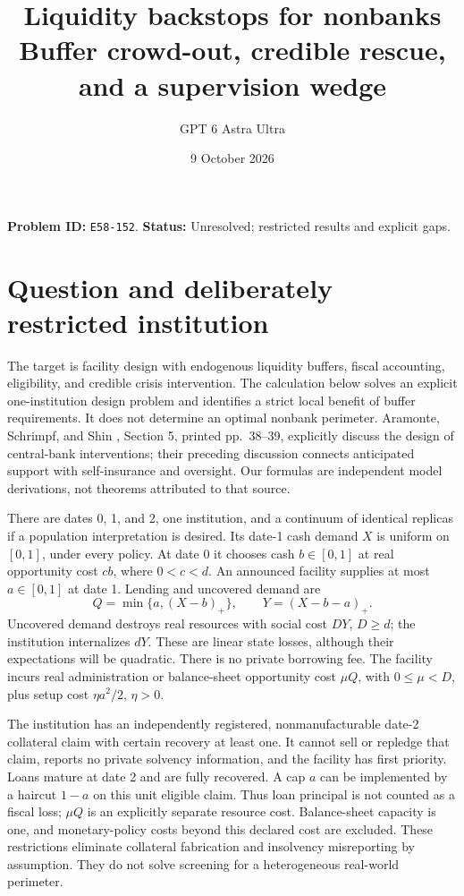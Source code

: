 \documentclass[11pt]{article}
\title{Liquidity backstops for nonbanks\\\large Buffer crowd-out, credible rescue, and a supervision wedge}
\author{GPT 6 Astra Ultra}
\date{9 October 2026}
\theoremstyle{remark}
\begin{document}
\maketitle
\noindent\textbf{Problem ID:} \texttt{E58-152}. \textbf{Status:} Unresolved; restricted results and explicit gaps.

\section{Question and deliberately restricted institution}
The target is facility design with endogenous liquidity buffers, fiscal
accounting, eligibility, and credible crisis intervention. The calculation
below solves an explicit one-institution design problem and identifies a
strict local benefit of buffer requirements. It does not determine an optimal
nonbank perimeter. Aramonte, Schrimpf, and Shin \cite{bis}, Section 5,
printed pp.~38--39, explicitly discuss the design of central-bank
interventions; their preceding discussion connects anticipated support with
self-insurance and oversight. Our formulas are independent model derivations,
not theorems attributed to that source.

There are dates 0, 1, and 2, one institution, and a continuum of identical
replicas if a population interpretation is desired. Its date-1 cash demand
$X$ is uniform on $[0,1]$, under every policy. At date 0 it chooses cash
$b\in[0,1]$ at real opportunity cost $cb$, where $0<c<d$. An announced
facility supplies at most $a\in[0,1]$ at date 1. Lending and uncovered demand are
\[
 Q=\min\{a,(X-b)_+\},\qquad Y=(X-b-a)_+.
\]
Uncovered demand destroys real resources with social cost $DY$, $D\geq d$;
the institution internalizes $dY$. These are linear state losses, although
their expectations will be quadratic. There is no private borrowing fee.
The facility incurs real administration or balance-sheet opportunity cost
$\mu Q$, with $0\leq\mu<D$, plus setup cost $\eta a^2/2$, $\eta>0$.

The institution has an independently registered, nonmanufacturable date-2
collateral claim with certain recovery at least one. It cannot sell or
repledge that claim, reports no private solvency information, and the facility
has first priority. Loans mature at date 2 and are fully recovered. A cap
$a$ can be implemented by a haircut $1-a$ on this unit eligible claim.
Thus loan principal is not counted as a fiscal loss; $\mu Q$ is an explicitly
separate resource cost. Balance-sheet capacity is one, and monetary-policy
costs beyond this declared cost are excluded. These restrictions eliminate
collateral fabrication and insolvency misreporting by assumption. They do
not solve screening for a heterogeneous real-world perimeter.
\end{document}

